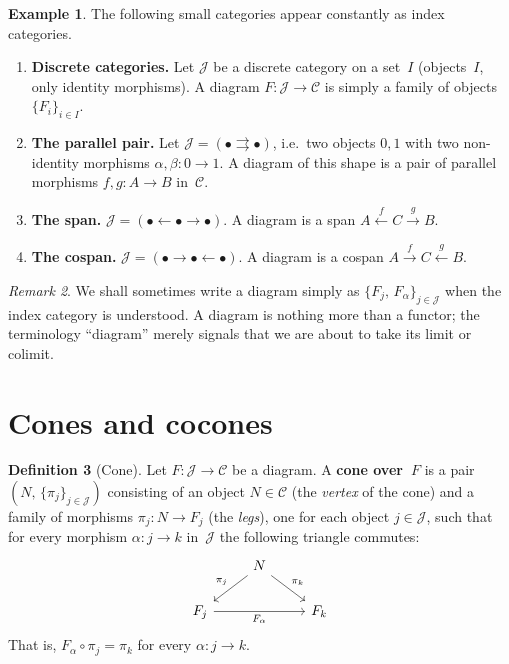 \documentclass[a4paper,12pt]{book}
\theoremstyle{definition}
\newtheorem{definition}{Definition}[section]
\newtheorem{example}[definition]{Example}
\theoremstyle{plain}
\theoremstyle{remark}
\newtheorem{remark}[definition]{Remark}
\begin{document}
\begin{example}\label{ex:diagrams-shapes}
The following small categories appear constantly as index categories.
\begin{enumerate}[label=(\roman*)]
\item \textbf{Discrete categories.}
    Let $\mathcal{J}$ be a discrete category on a set~$I$
    (objects~$I$, only identity morphisms).
    A diagram $F\colon \mathcal{J}\to\mathcal{C}$ is simply a family
    of objects $\{F_i\}_{i\in I}$.

\item \textbf{The parallel pair.}
    Let $\mathcal{J} = (\bullet \rightrightarrows \bullet)$,
    i.e.\ two objects $0,1$ with two non-identity morphisms
    $\alpha,\beta\colon 0\to 1$.
    A diagram of this shape is a pair of parallel morphisms
    $f,g\colon A\to B$ in~$\mathcal{C}$.

\item \textbf{The span.}
    $\mathcal{J} = (\bullet \leftarrow \bullet \rightarrow \bullet)$.
    A diagram is a span $A \xleftarrow{f} C \xrightarrow{g} B$.

\item \textbf{The cospan.}
    $\mathcal{J} = (\bullet \rightarrow \bullet \leftarrow \bullet)$.
    A diagram is a cospan $A \xrightarrow{f} C \xleftarrow{g} B$.
\end{enumerate}
\end{example}

\begin{remark}\label{rem:diagram-notation}
We shall sometimes write a diagram simply as
$\{F_j,\,F_\alpha\}_{j\in\mathcal{J}}$
when the index category is understood.
A diagram is nothing more than a functor; the terminology ``diagram''
merely signals that we are about to take its limit or colimit.
\end{remark}


\section{Cones and cocones}\label{sec:cones}

\begin{definition}[Cone]\label{def:cone}
Let $F\colon \mathcal{J}\to\mathcal{C}$ be a diagram.
A \textbf{cone over~$F$} is a pair $(N,\,\{\pi_j\}_{j\in\mathcal{J}})$
consisting of an object $N\in\mathcal{C}$ (the \emph{vertex} of the cone)
and a family of morphisms $\pi_j\colon N\to F_j$ (the \emph{legs}),
one for each object $j\in\mathcal{J}$,
such that for every morphism $\alpha\colon j\to k$ in~$\mathcal{J}$
the following triangle commutes:
\[
\begin{tikzcd}
& N \arrow[dl, "\pi_j"'] \arrow[dr, "\pi_k"] & \\
F_j \arrow[rr, "F_\alpha"'] & & F_k
\end{tikzcd}
\]
That is, $F_\alpha \circ \pi_j = \pi_k$ for every $\alpha\colon j\to k$.
\end{definition}
\end{document}
